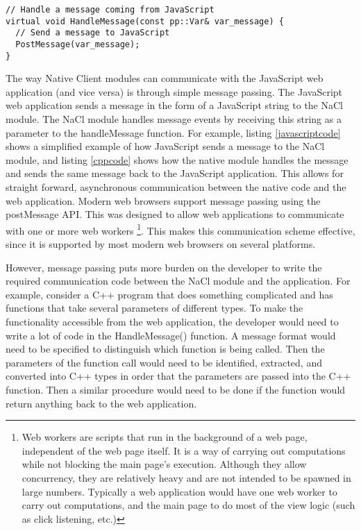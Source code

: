 \begin{lstlisting}
// Handle a message coming from JavaScript
virtual void HandleMessage(const pp::Var& var_message) {
  // Send a message to JavaScript
  PostMessage(var_message);
}
\end{lstlisting}

The way Native Client modules can communicate with the JavaScript web 
application (and vice versa) is through simple message passing. The JavaScript 
web application sends a message in the form of a JavaScript string to the NaCl 
module. The NaCl module handles message events by receiving this string as a 
parameter to the handleMessage function. For example, listing 
\ref{javascriptcode} shows a simplified example of how JavaScript sends a 
message to the NaCl module, and listing \ref{cppcode} shows how the native 
module handles the message and sends the same message back to the JavaScript application. This allows for straight forward, asynchronous communication 
between the native code and the web application. Modern web browsers support 
message passing using the postMessage API. This was designed to allow web 
applications to communicate with one or more web workers
\footnote{Web workers\cite{webworkersw3c} are scripts that run in the 
background of a web page, independent of the web page itself. It is a way of 
carrying out computations while not blocking the main page's execution. 
Although they allow concurrency, they are relatively heavy and are not intended 
to be spawned in large numbers. Typically a web application would have one web 
worker to carry out computations, and the main page to do most of the view 
logic (such as click listening, etc.)}. 
This makes this communication scheme effective, since it is supported by most 
modern web browsers on several platforms.

However, message passing puts more burden on the developer to write the 
required communication code between the NaCl module and the application. For 
example, consider a C++ program that does something complicated and has 
functions that take several parameters of different types. To make the 
functionality accessible from the web application, the developer would need to 
write a lot of code in the HandleMessage() function. A message format would 
need to be specified to distinguish which function is being called. Then the 
parameters of the function call would need to be identified, extracted, and 
converted into C++ types in order that the parameters are passed into the C++ 
function. Then a similar procedure would need to be done if the function would 
return anything back to the web application. 

